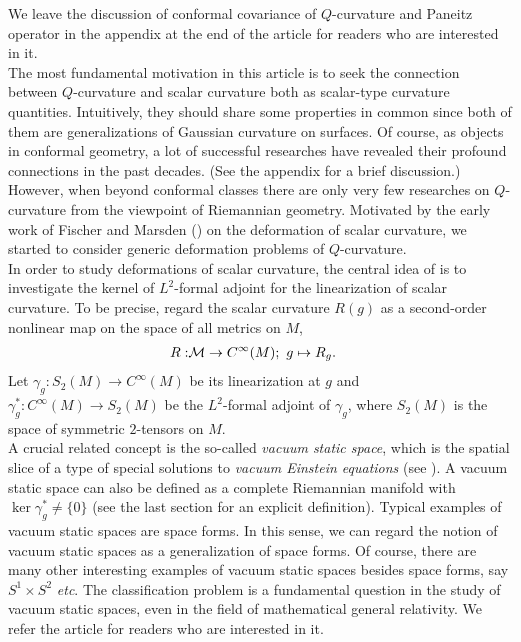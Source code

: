\documentclass[12pt]{amsart}
\theoremstyle{definition}
\theoremstyle{remark}
\numberwithin{equation}{section}
\begin{document}
We leave the discussion of conformal covariance of $Q$-curvature and Paneitz operator in the appendix at the end of the article for readers who are interested in it.\\

The most fundamental motivation in this article is to seek the connection between $Q$-curvature and scalar curvature both as scalar-type curvature quantities. Intuitively, they should share some properties in common since both of them are generalizations of Gaussian curvature on surfaces. Of course, as objects in conformal geometry, a lot of successful researches have revealed their profound connections in the past decades. (See the appendix for a brief discussion.) However, when beyond conformal classes there are only very few researches on $Q$-curvature from the viewpoint of Riemannian geometry. 
Motivated by the early work of Fischer and Marsden (\cite{F-M}) on the deformation of scalar curvature, we started to consider generic deformation problems of $Q$-curvature. \\

In order to study deformations of scalar curvature, the central idea of \cite{F-M} is to investigate the kernel of $L^2$-formal adjoint for the linearization of scalar curvature. To be precise, regard the scalar curvature $R(g)$ as a second-order nonlinear map on the space of all metrics on $M$, 
\begin{align*}
\notag
R: &\mathcal{M} \rightarrow C^{\infty}(M); \ 
g\mapsto R_{g}.
\end{align*}
Let $\gamma_g : S_2(M) \rightarrow C^\infty(M)$ be its linearization at $g$ and $\gamma_g^*: C^\infty(M) \rightarrow S_2(M)$ be the $L^2$-formal adjoint of $\gamma_g$, where $S_2(M)$ is the space of symmetric $2$-tensors on $M$. \\

A crucial related concept is the so-called \emph{vacuum static space}, which is the spatial slice of a type of special solutions to \emph{vacuum Einstein equations} (see \cite{Q-Y}). A vacuum static space can also be defined as a complete Riemannian manifold with $\ker \gamma_g^* \neq \{0\}$ (see the last section for an explicit definition). Typical examples of vacuum static spaces are space forms. In this sense, we can regard the notion of vacuum static spaces as a generalization of space forms. Of course, there are many other interesting examples of vacuum static spaces besides space forms, say $S^1\times S^2$ \emph{etc}. 
 The classification problem is a fundamental question in the study of vacuum static spaces, even in the field of mathematical general relativity. We refer the article \cite{Q-Y} for readers who are interested in it.\\
\end{document}
